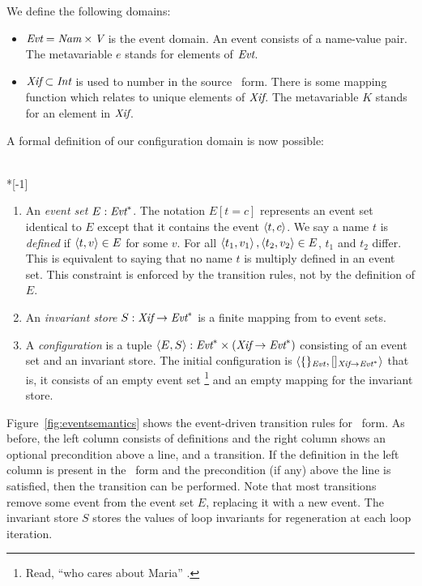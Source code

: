 \documentclass[12pt,titlepage,twoside]{article}
\begin{document}
We define the following domains:
\begin{itemize}
\item ${\mbox{\em Evt}} = {\mbox{\em Nam}} \times {\mbox{\em V}}$ is the event
domain.  An event consists of a name-value pair.  The metavariable $e$
stands for elements of ${\mbox{\em Evt}}$.
\item ${\mbox{\em Xif}} \subset {\mbox{\em Int}}$ is used to number
 in the source \ssiplus\ form.  There is some mapping
function which relates  to unique elements of
${\mbox{\em Xif}}$.  The metavariable $K$ stands for an element in
${\mbox{\em Xif}}$.
\end{itemize}

A formal definition of our configuration domain is now possible:
\begin{definition}~\\*[-1\baselineskip]
\begin{enumerate}
\item An \emph{event set} $E:{\mbox{\em Evt}}^*$.
The notation $E[t=c]$ represents an event set
identical to $E$ except that it contains the event $\left\langle t,c \right\rangle$.  We
say a name $t$ is \emph{defined} if $\left\langle t,v \right\rangle \in E$ for some $v$.
For all $\left\langle t_1,v_1 \right\rangle,\left\langle t_2,v_2 \right\rangle \in E$, $t_1$ and $t_2$
differ.  This is equivalent to saying that no name $t$ is multiply
defined in an event set.  This constraint is enforced by the
transition rules, not by the definition of $E$.
\item An \emph{invariant store} $S: {\mbox{\em Xif}} \to
{\mbox{\em Evt}}^*$ is a finite mapping from  to event sets.
\item A \emph{configuration} is a tuple
$\left\langle E, S \right\rangle:{\mbox{\em Evt}}^* \times ({\mbox{\em Xif}}\to{\mbox{\em Evt}}^*)$ consisting
of an event set and an invariant store.  The initial
configuration is
$\left\langle \{\}_{{\mbox{\scriptsize\em Evt}}},
        []_{{\mbox{\scriptsize\em Xif}} \to {\mbox{\scriptsize\em Evt}}^*} \right\rangle$
that is, it consists of an empty event set%
\footnote{Read, ``who cares about Maria'' \cite{marinov99}.}
and an empty mapping for the invariant store.%
\end{enumerate}
\end{definition}

Figure~\vref{fig:eventsemantics} shows the event-driven transition
rules for \ssiplus\ form.  As before, the left column consists of
definitions and the right column shows an optional precondition above
a line, and a transition.  If the definition in the left column is
present in the \ssiplus\ form and the precondition (if any) above the
line is satisfied, then the transition can be performed.  Note that
most transitions remove some event from the event set $E$, replacing
it with a new event.  The invariant store $S$ stores
the values of loop invariants for regeneration at each loop iteration.
\end{document}
